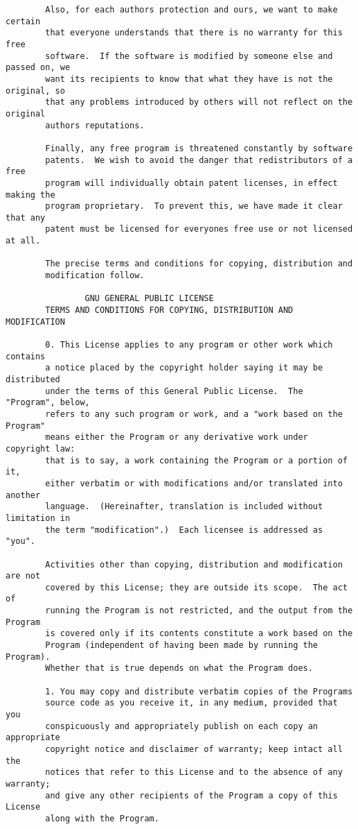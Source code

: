 \documentclass[a4paper,twoside,12pt]{book}
\begin{document}
{\begin{verbatim}
		Also, for each authors protection and ours, we want to make certain
		that everyone understands that there is no warranty for this free
		software.  If the software is modified by someone else and passed on, we
		want its recipients to know that what they have is not the original, so
		that any problems introduced by others will not reflect on the original
		authors reputations.

		Finally, any free program is threatened constantly by software
		patents.  We wish to avoid the danger that redistributors of a free
		program will individually obtain patent licenses, in effect making the
		program proprietary.  To prevent this, we have made it clear that any
		patent must be licensed for everyones free use or not licensed at all.

		The precise terms and conditions for copying, distribution and
		modification follow.

				GNU GENERAL PUBLIC LICENSE
		TERMS AND CONDITIONS FOR COPYING, DISTRIBUTION AND MODIFICATION

		0. This License applies to any program or other work which contains
		a notice placed by the copyright holder saying it may be distributed
		under the terms of this General Public License.  The "Program", below,
		refers to any such program or work, and a "work based on the Program"
		means either the Program or any derivative work under copyright law:
		that is to say, a work containing the Program or a portion of it,
		either verbatim or with modifications and/or translated into another
		language.  (Hereinafter, translation is included without limitation in
		the term "modification".)  Each licensee is addressed as "you".

		Activities other than copying, distribution and modification are not
		covered by this License; they are outside its scope.  The act of
		running the Program is not restricted, and the output from the Program
		is covered only if its contents constitute a work based on the
		Program (independent of having been made by running the Program).
		Whether that is true depends on what the Program does.

		1. You may copy and distribute verbatim copies of the Programs
		source code as you receive it, in any medium, provided that you
		conspicuously and appropriately publish on each copy an appropriate
		copyright notice and disclaimer of warranty; keep intact all the
		notices that refer to this License and to the absence of any warranty;
		and give any other recipients of the Program a copy of this License
		along with the Program.


\end{verbatim}}
\end{document}
